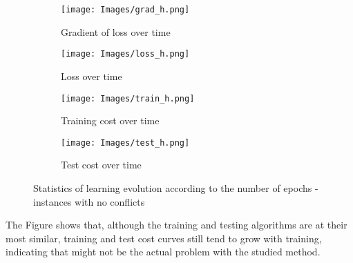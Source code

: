 \begin{figure}[H]
\centering
\begin{subfigure}[b]{0.3\textwidth}
    \texttt{[image: Images/grad\_h.png]}
    \caption{Gradient of loss over time}
    \label{fig:grad_loss_h}
\end{subfigure}
\hspace{0.01\textwidth}
\begin{subfigure}[b]{0.3\textwidth}
    \texttt{[image: Images/loss\_h.png]}
    \caption{Loss over time}
    \label{fig:loss_h}
\end{subfigure}

\vspace{0.5cm}

\begin{subfigure}[b]{0.3\textwidth}
    \texttt{[image: Images/train\_h.png]}
    \caption{Training cost over time}
    \label{fig:training_cost_h}
\end{subfigure}
\hspace{0.01\textwidth}
\begin{subfigure}[b]{0.3\textwidth}
    \texttt{[image: Images/test\_h.png]}
    \caption{Test cost over time}
    \label{fig:test_cost_h}
\end{subfigure}
    
\caption{Statistics of learning evolution according to the number of epochs - instances with no conflicts}
\label{fig:loss_graph_h}
\end{figure}

The Figure shows that, although the training and testing algorithms are at their most similar, training and test cost curves still tend to grow with training, indicating that might not be the actual problem with the studied method.